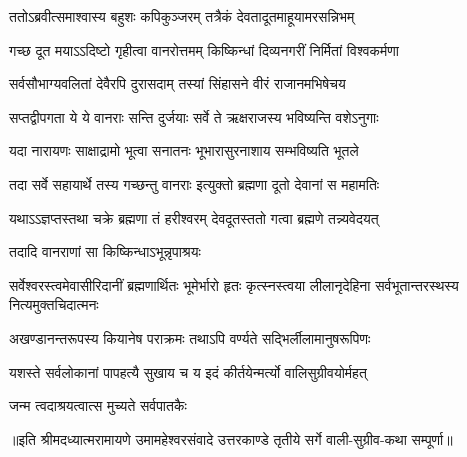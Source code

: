 \twolineshloka
{ततोऽब्रवीत्समाश्वास्य बहुशः कपिकुञ्जरम्}
{तत्रैकं देवतादूतमाहूयामरसन्निभम्} %

\twolineshloka
{गच्छ दूत मयाऽऽदिष्टो गृहीत्वा वानरोत्तमम्}
{किष्किन्धां दिव्यनगरीं निर्मितां विश्वकर्मणा} %

\twolineshloka
{सर्वसौभाग्यवलितां देवैरपि दुरासदाम्}
{तस्यां सिंहासने वीरं राजानमभिषेचय} %

\twolineshloka
{सप्तद्वीपगता ये ये वानराः सन्ति दुर्जयाः}
{सर्वे ते ऋक्षराजस्य भविष्यन्ति वशेऽनुगाः} %

\twolineshloka
{यदा नारायणः साक्षाद्रामो भूत्वा सनातनः}
{भूभारासुरनाशाय सम्भविष्यति भूतले} %

\twolineshloka
{तदा सर्वे सहायार्थे तस्य गच्छन्तु वानराः}
{इत्युक्तो ब्रह्मणा दूतो देवानां स महामतिः} %

\twolineshloka
{यथाऽऽज्ञप्तस्तथा चक्रे ब्रह्मणा तं हरीश्वरम्}
{देवदूतस्ततो गत्वा ब्रह्मणे तन्न्यवेदयत्} %

\onelineshloka
{तदादि वानराणां सा किष्किन्धाऽभून्नृपाश्रयः} %

\threelineshloka
{सर्वेश्वरस्त्वमेवासीरिदानीं ब्रह्मणार्थितः}
{भूमेर्भारो हृतः कृत्स्नस्त्वया लीलानृदेहिना}
{सर्वभूतान्तरस्थस्य नित्यमुक्तचिदात्मनः} %

\twolineshloka
{अखण्डानन्तरूपस्य कियानेष पराक्रमः}
{तथाऽपि वर्ण्यते सद्भिर्लीलामानुषरूपिणः} %

\twolineshloka
{यशस्ते सर्वलोकानां पापहत्यै सुखाय च}
{य इदं कीर्तयेन्मर्त्यो वालिसुग्रीवयोर्महत्} %

\onelineshloka
{जन्म त्वदाश्रयत्वात्स मुच्यते सर्वपातकैः} %

{॥इति श्रीमदध्यात्मरामायणे उमामहेश्वरसंवादे उत्तरकाण्डे तृतीये  सर्गे 
वाली-सुग्रीव-कथा सम्पूर्णा॥}
